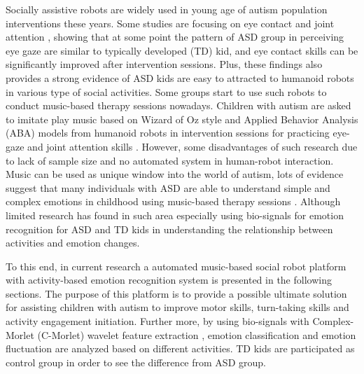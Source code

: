 Socially assistive robots are widely used in young age of autism population interventions these years. Some studies are
focusing on eye contact and joint attention \cite{feng2013can, mihalache2020perceiving, mavadati2014comparing}, 
showing that at some point the pattern of ASD group in perceiving eye gaze are similar to typically 
developed (TD) kid, and eye contact skills can be significantly improved after intervention sessions. Plus,
these findings also provides a strong evidence of ASD kids are easy to attracted to humanoid robots in
various type of social activities. Some groups start to use such robots to conduct music-based therapy
sessions nowadays. Children with autism are asked to imitate play music based on Wizard of Oz style
and Applied Behavior Analysis (ABA) models from humanoid robots in intervention sessions for practicing
eye-gaze and joint attention skills \cite{peng2014using, taheri2015impact, taheri2016social}. However, 
some disadvantages of such research due to lack of sample size and no automated system in human-robot 
interaction. Music can be used as unique window into the world of autism, lots of evidence suggest that
many individuals with ASD are able to understand simple and complex emotions in childhood using music-based
therapy sessions \cite{molnar2012music}. Although limited research has found in such area especially using
bio-signals for emotion recognition for ASD and TD kids \cite{feng2018wavelet} in understanding the 
relationship between activities and emotion changes. 

To this end, in current research a automated music-based social robot platform with activity-based emotion 
recognition system is presented in the following sections. The purpose of this platform is to provide a 
possible ultimate solution for assisting children with autism to improve motor skills, turn-taking skills 
and activity engagement initiation. Further more, by using bio-signals with Complex-Morlet (C-Morlet) wavelet feature 
extraction \cite{feng2018wavelet}, emotion classification and emotion fluctuation are analyzed based on different 
activities. TD kids are participated as control group in order to see the difference from ASD group.\\





